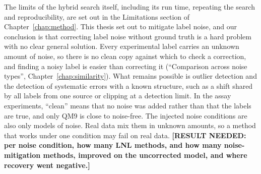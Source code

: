 
The limits of the hybrid search itself, including its run time, repeating the search and reproducibility, are set out in the Limitations section of Chapter~\ref{chap:method}. This thesis set out to mitigate label noise, and our conclusion is that correcting label noise without ground truth is a hard problem with no clear general solution. Every experimental label carries an unknown amount of noise, so there is no clean copy against which to check a correction, and finding a noisy label is easier than correcting it (``Comparison across noise types'', Chapter~\ref{chap:similarity}). What remains possible is outlier detection and the detection of systematic errors with a known structure, such as a shift shared by all labels from one source or clipping at a detection limit. In the assay experiments, ``clean'' means that no noise was added rather than that the labels are true, and only QM9 is close to noise-free. The injected noise conditions are also only models of noise. Real data mix them in unknown amounts, so a method that works under one condition may fail on real data. \textbf{[RESULT NEEDED: per noise condition, how many LNL methods, and how many noise-mitigation methods, improved on the uncorrected model, and where recovery went negative.]}

